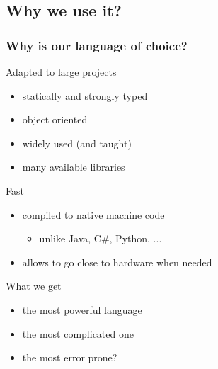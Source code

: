 \subsection[Use]{Why we use it?}

\begin{frame}
  \frametitle{Why is \cpp{} our language of choice?}
  \begin{block}{Adapted to large projects}
    \begin{itemize}
    \item statically and strongly typed
    \item object oriented
    \item widely used (and taught)
    \item many available libraries
    \end{itemize}
  \end{block}
  \pause
  \begin{block}{Fast}
    \begin{itemize}
    \item compiled to native machine code
      \begin{itemize}
      \item unlike Java, C\#, Python, ...
      \end{itemize}
    \item allows to go close to hardware when needed
    \end{itemize}
  \end{block}
  \pause
  \begin{alertblock}{What we get}
    \begin{itemize}
    \item the most powerful language
    \item the most complicated one
    \item the most error prone?
    \end{itemize}
  \end{alertblock}
\end{frame}
